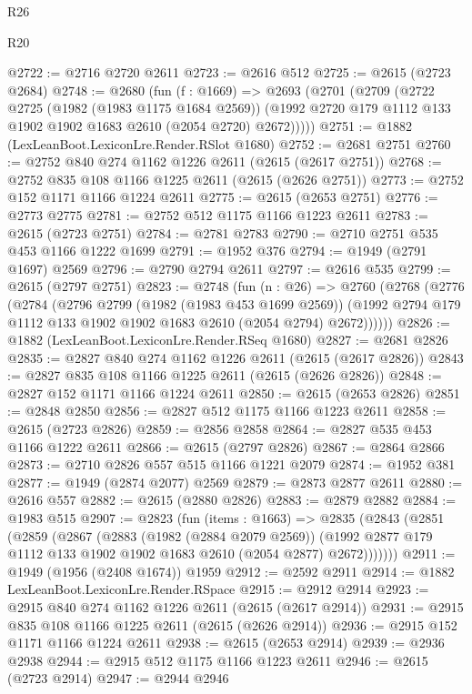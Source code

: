 \begin{lexlean}{R26}
\begin{lexlean}{R20}
\begin{coremodule}
{{{{{{{{{{{{{{{{{{{{{{{{{{{{{{{{{{{{{{{{{{{{{{{{{{{{{{{{{{{{{{{@2722 := @2716 @2720 @2611
@2723 := @2616 @512
@2725 := @2615 (@2723 @2684)
@2748 := @2680
    (fun (f : @1669) =>
    @2693
      (@2701
        (@2709
          (@2722
            @2725
            (@1982 (@1983 @1175 @1684 @2569))
            (@1992 @2720 @179 @1112 @133 @1902 @1902 @1683 @2610 (@2054 @2720) @2672)))))
@2751 := @1882 (LexLeanBoot.LexiconLre.Render.RSlot @1680)
@2752 := @2681 @2751
@2760 := @2752 @840 @274 @1162 @1226 @2611 (@2615 (@2617 @2751))
@2768 := @2752 @835 @108 @1166 @1225 @2611 (@2615 (@2626 @2751))
@2773 := @2752 @152 @1171 @1166 @1224 @2611
@2775 := @2615 (@2653 @2751)
@2776 := @2773 @2775
@2781 := @2752 @512 @1175 @1166 @1223 @2611
@2783 := @2615 (@2723 @2751)
@2784 := @2781 @2783
@2790 := @2710 @2751 @535 @453 @1166 @1222 @1699
@2791 := @1952 @376
@2794 := @1949 (@2791 @1697) @2569
@2796 := @2790 @2794 @2611
@2797 := @2616 @535
@2799 := @2615 (@2797 @2751)
@2823 := @2748
    (fun (n : @26) =>
    @2760
      (@2768
        (@2776
          (@2784
            (@2796
              @2799
              (@1982 (@1983 @453 @1699 @2569))
              (@1992 @2794 @179 @1112 @133 @1902 @1902 @1683 @2610 (@2054 @2794) @2672))))))
@2826 := @1882 (LexLeanBoot.LexiconLre.Render.RSeq @1680)
@2827 := @2681 @2826
@2835 := @2827 @840 @274 @1162 @1226 @2611 (@2615 (@2617 @2826))
@2843 := @2827 @835 @108 @1166 @1225 @2611 (@2615 (@2626 @2826))
@2848 := @2827 @152 @1171 @1166 @1224 @2611
@2850 := @2615 (@2653 @2826)
@2851 := @2848 @2850
@2856 := @2827 @512 @1175 @1166 @1223 @2611
@2858 := @2615 (@2723 @2826)
@2859 := @2856 @2858
@2864 := @2827 @535 @453 @1166 @1222 @2611
@2866 := @2615 (@2797 @2826)
@2867 := @2864 @2866
@2873 := @2710 @2826 @557 @515 @1166 @1221 @2079
@2874 := @1952 @381
@2877 := @1949 (@2874 @2077) @2569
@2879 := @2873 @2877 @2611
@2880 := @2616 @557
@2882 := @2615 (@2880 @2826)
@2883 := @2879 @2882
@2884 := @1983 @515
@2907 := @2823
    (fun (items : @1663) =>
    @2835
      (@2843
        (@2851
          (@2859
            (@2867
              (@2883
                (@1982 (@2884 @2079 @2569))
                (@1992 @2877 @179 @1112 @133 @1902 @1902 @1683 @2610 (@2054 @2877) @2672)))))))
@2911 := @1949 (@1956 (@2408 @1674)) @1959
@2912 := @2592 @2911
@2914 := @1882 LexLeanBoot.LexiconLre.Render.RSpace
@2915 := @2912 @2914
@2923 := @2915 @840 @274 @1162 @1226 @2611 (@2615 (@2617 @2914))
@2931 := @2915 @835 @108 @1166 @1225 @2611 (@2615 (@2626 @2914))
@2936 := @2915 @152 @1171 @1166 @1224 @2611
@2938 := @2615 (@2653 @2914)
@2939 := @2936 @2938
@2944 := @2915 @512 @1175 @1166 @1223 @2611
@2946 := @2615 (@2723 @2914)
@2947 := @2944 @2946
}}}}}}}}}}}}}}}}}}}}}}}}}}}}}}}}}}}}}}}}}}}}}}}}}}}}}}}}}}}}}}}
\end{coremodule}
\end{lexlean}
\end{lexlean}
